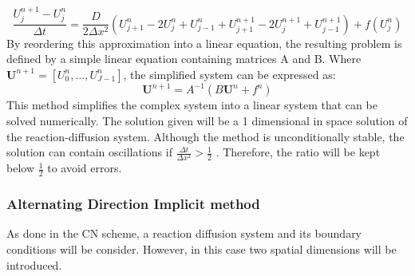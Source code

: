 \begin{equation}
    \frac{U^{n+1}_{j} - U^{n}_{j} }{\Delta t} = \frac{D}{2\Delta x^{2}}\left( U^{n}_{j+1} -  2U^{n}_{j} + U^{n}_{j-1} + U^{n+1}_{j+1} - 2U^{n+1}_{j} + U^{n+1}_{j-1}\right) +  f( U^{n}_{j})
\end{equation}
By reordering this approximation into a linear equation, the resulting problem is defined by a simple linear equation containing matrices A and B. Where $\textbf{U}^{n+1} = [U^{n}_{0}, ... , U^{n}_{J-1}]$, the simplified system can be expressed as:
\begin{equation}
    \textbf{U}^{n+1} = A^{-1}(B\textbf{U}^{n} + f^{n})
\end{equation}
This method simplifies the complex system into a linear system that can be solved numerically. The solution given will be a 1 dimensional in space solution of the reaction-diffusion system. Although the method is  unconditionally stable, the solution can contain oscillations if $ \frac{\Delta t}{\Delta x^{2}} >\frac{1}{2} $ \parencite{trefethen1996finite}. Therefore, the ratio will be kept below $\frac{1}{2}$ to avoid errors.

\subsubsection{Alternating Direction Implicit method}
As done in the CN scheme, a reaction diffusion system and its boundary conditions will be consider. However, in this case two spatial dimensions will be introduced.

